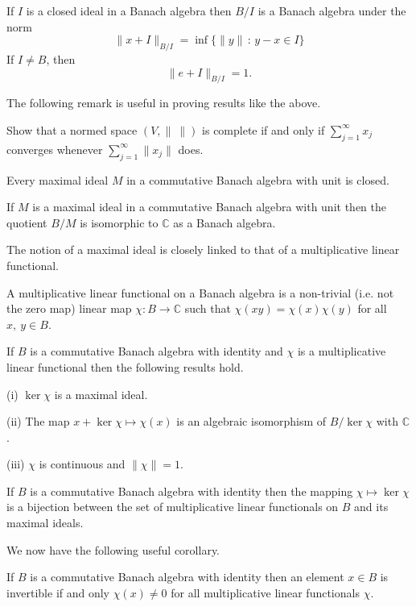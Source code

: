 \begin{added}[Lemma] If $I$ is a closed ideal in a Banach algebra
then $B/I$ is a Banach algebra under the norm
\[\|x+I\|_{B/I}=\inf\{\|y\|\,:\,y-x\in I\}\]
If $I\neq B$, then
\[\|e+I\|_{B/I}=1.\]
\end{added}
\begin{added}[Exercise] The following remark is useful
in proving results like the above.

Show that a normed space $(V,\|\ \|)$ is complete
if and only if $\sum_{j=1}^{\infty}x_{j}$ converges whenever
$\sum_{j=1}^{\infty}\|x_{j}\|$ does.
\end{added}
\begin{lemma} Every maximal ideal $M$ in a commutative
Banach algebra with unit is closed.
\end{lemma}
\begin{lemma} If $M$ is a maximal ideal in a commutative
Banach algebra with unit then the quotient $B/M$
is isomorphic to ${\mathbb C}$ as a Banach algebra.
\end{lemma} 


The notion of a maximal ideal is closely linked
to that of a multiplicative linear functional.
\begin{definition} A multiplicative linear functional
on a Banach algebra is  a non-trivial
(i.e. not the zero map)
linear map $\chi:B\rightarrow{\mathbb C}$
such that $\chi(xy)=\chi(x)\chi(y)$ for all $x,\ y\in B$.
\end{definition}
\begin{lemma} If $B$ is a commutative Banach algebra
with identity and $\chi$ is a multiplicative linear
functional then the following results hold.

(i) $\ker\chi$ is a maximal ideal.

(ii) The map $x+\ker\chi\mapsto\chi(x)$ is an algebraic 
isomorphism of $B/\ker\chi$ with ${\mathbb C}$.

(iii) $\chi$ is continuous and $\|\chi\|=1$.
\end{lemma}
\begin{theorem}\label{Theorem, functionals and ideals}
If $B$ is a commutative Banach algebra
with identity then the mapping $\chi\mapsto\ker\chi$
is a bijection between the set of multiplicative
linear functionals on $B$ and its maximal ideals.
\end{theorem}
We now have the following useful corollary.
\begin{lemma} If $B$ is a commutative Banach algebra
with identity then an element $x\in B$ is invertible if
and only $\chi(x)\neq 0$ for all multiplicative
linear functionals $\chi$.
\end{lemma}

